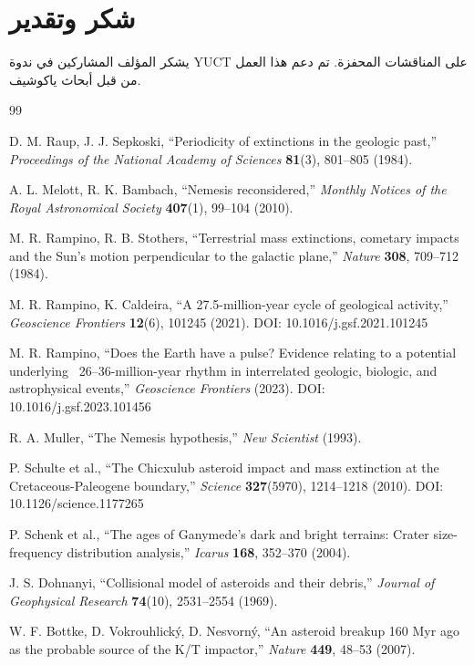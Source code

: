 \documentclass[11pt,a4paper]{article}
\begin{document}
	\section*{شكر وتقدير}
	يشكر المؤلف المشاركين في ندوة YUCT على المناقشات المحفزة. تم دعم هذا العمل من قبل أبحاث ياكوشيف.
	
	\begin{thebibliography}{99}
		
		D. M. Raup, J. J. Sepkoski, ``Periodicity of extinctions in the geologic past,''
		\emph{Proceedings of the National Academy of Sciences} \textbf{81}(3), 801–805 (1984).
		
		A. L. Melott, R. K. Bambach, ``Nemesis reconsidered,''
		\emph{Monthly Notices of the Royal Astronomical Society} \textbf{407}(1), 99–104 (2010).
		
		M. R. Rampino, R. B. Stothers, ``Terrestrial mass extinctions, cometary impacts and the Sun's motion perpendicular to the galactic plane,''
		\emph{Nature} \textbf{308}, 709–712 (1984).
		
		M. R. Rampino, K. Caldeira, ``A 27.5-million-year cycle of geological activity,''
		\emph{Geoscience Frontiers} \textbf{12}(6), 101245 (2021). DOI: 10.1016/j.gsf.2021.101245
		
		M. R. Rampino, ``Does the Earth have a pulse? Evidence relating to a potential underlying ~26–36-million-year rhythm in interrelated geologic, biologic, and astrophysical events,''
		\emph{Geoscience Frontiers} (2023). DOI: 10.1016/j.gsf.2023.101456
		
		R. A. Muller, ``The Nemesis hypothesis,''
		\emph{New Scientist} (1993).
		
		P. Schulte et al., ``The Chicxulub asteroid impact and mass extinction at the Cretaceous-Paleogene boundary,''
		\emph{Science} \textbf{327}(5970), 1214–1218 (2010). DOI: 10.1126/science.1177265
		
		P. Schenk et al., ``The ages of Ganymede's dark and bright terrains: Crater size-frequency distribution analysis,''
		\emph{Icarus} \textbf{168}, 352–370 (2004).
		
		J. S. Dohnanyi, ``Collisional model of asteroids and their debris,''
		\emph{Journal of Geophysical Research} \textbf{74}(10), 2531–2554 (1969).
		
		W. F. Bottke, D. Vokrouhlický, D. Nesvorný, ``An asteroid breakup 160 Myr ago as the probable source of the K/T impactor,''
		\emph{Nature} \textbf{449}, 48–53 (2007).
		

\end{thebibliography}
\end{document}
